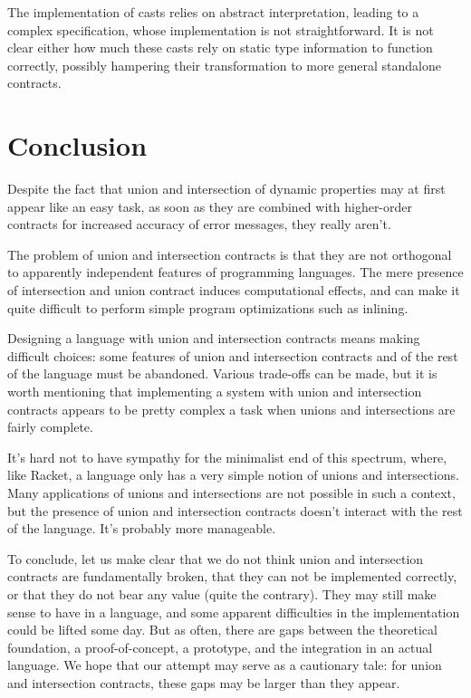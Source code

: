 \documentclass[sigplan,10pt,review,anonymous]{acmart}
\begin{document}
The implementation of casts relies on abstract interpretation, leading to a
complex specification, whose implementation is not straightforward. It is not clear
either how much these casts rely on static type information to function
correctly, possibly hampering their transformation to more general standalone
contracts.

\section{Conclusion}
\label{sec:conclusion}

Despite the fact that union and intersection of dynamic properties may
at first appear like an easy task, as soon as they are combined with
higher-order contracts for increased accuracy of error messages, they
really aren't.

The problem of union and intersection contracts is that they are not
orthogonal to apparently independent features of programming
languages. The mere presence of intersection and union contract
induces computational effects, and can make it quite difficult to
perform simple program optimizations such as inlining.

Designing a language with union and intersection contracts means
making difficult choices: some features of union and intersection
contracts and of the rest of the language must be abandoned. Various
trade-offs can be made, but it is worth mentioning that implementing a
system with union and intersection contracts appears to be pretty
complex a task when unions and intersections are fairly complete.

It's hard not to have sympathy for the minimalist end of this
spectrum, where, like Racket, a language only has a very simple notion
of unions and intersections. Many applications of unions and
intersections are not possible in such a context, but the presence of
union and intersection contracts doesn't interact with the rest of the
language. It's probably more manageable.

To conclude, let us make clear that we do not think union and intersection
contracts are fundamentally broken, that they can not be implemented correctly,
or that they do not bear any value (quite the contrary). They may still make
sense to have in a language, and some apparent difficulties in the
implementation could be lifted some day. But as often, there are gaps between
the theoretical foundation, a proof-of-concept, a prototype, and the integration
in an actual language. We hope that our attempt may serve as a cautionary tale:
for union and intersection contracts, these gaps may be larger than
they appear.


\end{document}
